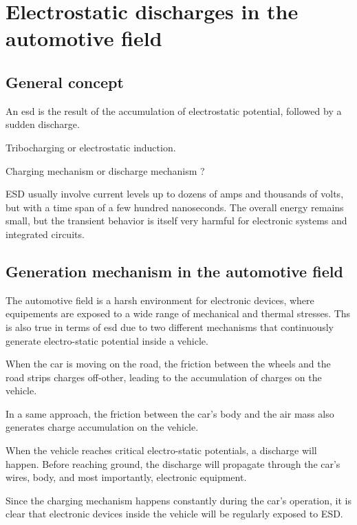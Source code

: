 \section{Electrostatic discharges in the automotive field}
\subsection{General concept}
An \gls{esd} is the result of the accumulation of electrostatic potential,
followed by a sudden discharge.

Tribocharging or electrostatic induction.

Charging mechanism or discharge mechanism ?

ESD usually involve current levels up to dozens of amps and thousands of volts, but with a time span of a few hundred nanoseconds.
The overall energy remains small, but the transient behavior is itself very harmful for electronic systems and integrated circuits.

\subsection{Generation mechanism in the automotive field}

The automotive field is a harsh environment for electronic devices, where equipements are exposed to a wide range of mechanical and thermal stresses.
Ths is also true in terms of \gls{esd} due to two different mechanisms that continuously generate electro-static potential inside a vehicle.

When the car is moving on the road, the friction between the wheels and the road strips charges off-other, leading to the accumulation of
charges on the vehicle.

In a same approach, the friction between the car's body and the air mass also generates charge accumulation on the vehicle.

When the vehicle reaches critical electro-static potentials, a discharge will happen. Before reaching ground, the discharge will propagate through
the car's wires, body, and most importantly, electronic equipment.

Since the charging mechanism happens constantly during the car's operation, it is clear that electronic devices inside the vehicle will be regularly
exposed to ESD.
